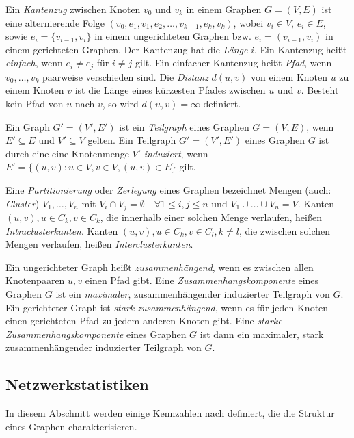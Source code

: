 Ein \emph{Kantenzug} zwischen Knoten $v_0$ und $v_k$ in einem Graphen
$G=(V, E)$ ist eine alternierende Folge $(v_0, e_1, v_1, e_2, \dots,
v_{k-1}, e_k, v_k)$, wobei $v_i \in V$, $e_i \in E$, sowie $e_i =
\{v_{i-1}, v_{i}\}$ in einem ungerichteten Graphen bzw. $e_i =
(v_{i-1}, v_{i})$ in einem gerichteten Graphen. Der Kantenzug hat die
\emph{Länge} $i$. Ein Kantenzug heißt \emph{einfach}, wenn $e_i \ne
e_j$ für $i \ne j$ gilt.  Ein einfacher Kantenzug heißt
\emph{Pfad}, wenn $v_0, \dots, v_k$ paarweise verschieden sind. Die
\emph{Distanz} $d(u, v)$ von einem Knoten $u$ zu einem Knoten $v$ ist die
Länge eines kürzesten Pfades zwischen $u$ und $v$. Besteht kein
Pfad von $u$ nach $v$, so wird $d(u,v) = \infty$ definiert.

Ein Graph $G' = (V', E')$ ist ein \emph{Teilgraph} eines Graphen $G =
(V, E)$, wenn $E' \subseteq E$ und $V' \subseteq V$ gelten. Ein
Teilgraph $G' = (V', E')$ eines Graphen $G$ ist durch eine eine
Knotenmenge $V'$ \emph{induziert}, wenn $E' = \{(u, v) : u \in V, v
\in V, (u, v) \in E\}$ gilt.

Eine \emph{Partitionierung} oder \emph{Zerlegung} eines Graphen
bezeichnet Mengen (auch: \emph{Cluster}) $V_1, \dots, V_n$ mit $V_i
\cap V_j = \emptyset \quad \forall 1 \le i, j \le n$ und $V_1 \cup
\dots \cup V_n = V$. Kanten $(u, v), u \in C_k, v \in C_k$, die
innerhalb einer solchen Menge verlaufen, heißen
\emph{Intraclusterkanten}. Kanten $(u, v), u \in C_k, v \in C_l, k \ne
l$, die zwischen solchen Mengen verlaufen, heißen
\emph{Interclusterkanten}.

Ein ungerichteter Graph heißt \emph{zusammenhängend}, wenn es
zwischen allen Knotenpaaren $u, v$ einen Pfad gibt. Eine
\emph{Zusammenhangskomponente} eines Graphen $G$ ist ein
\emph{maximaler}, zusammenhängender induzierter Teilgraph von
$G$. Ein gerichteter Graph ist \emph{stark zusammenhängend}, wenn es
für jeden Knoten einen gerichteten Pfad zu jedem anderen Knoten gibt. Eine
\emph{starke Zusammenhangskomponente} eines Graphen $G$ ist dann ein
maximaler, stark zusammenhängender induzierter Teilgraph von $G$.

\subsection{Netzwerkstatistiken}
\label{ch:Grundlagen:sec:Netzwerkanalyse:subsec:Statistiken}

In diesem Abschnitt werden einige Kennzahlen nach
\cite{Brinkmeier2004} definiert, die die Struktur eines Graphen
charakterisieren.


